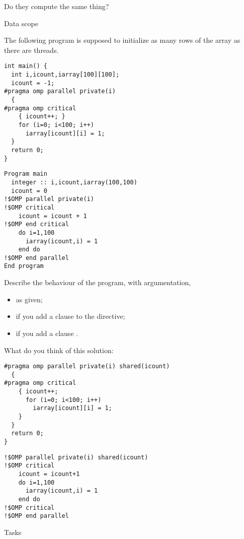 Do they compute the same thing?

\vfill\pagebreak

 {Data scope}

The following program is supposed to initialize as many
rows of the array as there are threads.

\begin{multicols}{2}
\small
\lstset{language=C}
\begin{lstlisting}
int main() {
  int i,icount,iarray[100][100];
  icount = -1;
#pragma omp parallel private(i)
  {
#pragma omp critical
    { icount++; }
    for (i=0; i<100; i++) 
      iarray[icount][i] = 1;
  }
  return 0;
}
\end{lstlisting}
\columnbreak
\lstset{language=Fortran}
\begin{lstlisting}
Program main
  integer :: i,icount,iarray(100,100)
  icount = 0
!$OMP parallel private(i)
!$OMP critical
    icount = icount + 1
!$OMP end critical
    do i=1,100
      iarray(icount,i) = 1
    end do
!$OMP end parallel
End program
\end{lstlisting}
\end{multicols}

Describe the behaviour of the program, with argumentation,
\begin{itemize}
\item as given;
\item if you add a clause  to the  directive;
\item if you add a clause .
\end{itemize}

What do you think of this solution:
\begin{multicols}{2}
\small
\lstset{language=C}
\begin{lstlisting}
#pragma omp parallel private(i) shared(icount)
  {
#pragma omp critical
    { icount++;
      for (i=0; i<100; i++) 
        iarray[icount][i] = 1;
    }
  }
  return 0;
}
\end{lstlisting}
\columnbreak

\lstset{language=Fortran}
\begin{lstlisting}
!$OMP parallel private(i) shared(icount)
!$OMP critical
    icount = icount+1
    do i=1,100
      iarray(icount,i) = 1
    end do
!$OMP critical
!$OMP end parallel
\end{lstlisting}
\end{multicols}

 {Tasks}

